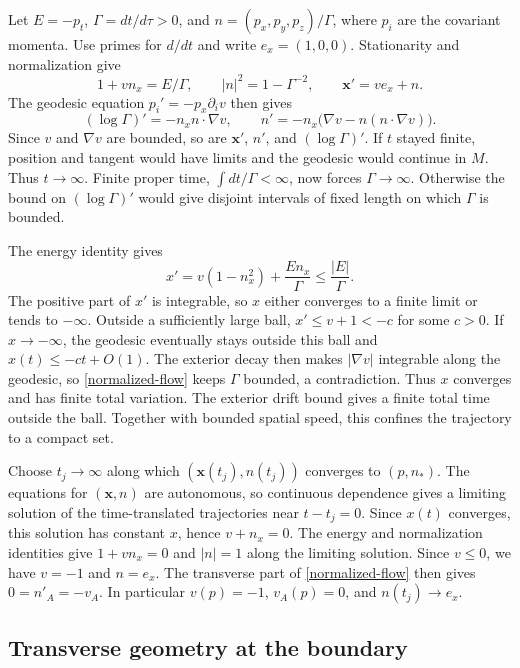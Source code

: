 \documentclass[12pt]{article}
\begin{document}
Let \(E=-p_t\), \(\Gamma=dt/d\tau>0\), and \(n=(p_x,p_y,p_z)/\Gamma\),
where \(p_i\) are the covariant momenta. Use primes for \(d/dt\) and
write \(e_x=(1,0,0)\). Stationarity and normalization give
\[
  1+vn_x=E/\Gamma,\qquad |n|^2=1-\Gamma^{-2},
  \qquad \boldsymbol{x}'=ve_x+n.
\]
The geodesic equation \(p_i'=-p_x\partial_i v\) then gives
\begin{equation}
 (\log\Gamma)'=-n_x n\cdot\nabla v,\qquad
 n'=-n_x\bigl(\nabla v-n(n\cdot\nabla v)\bigr).
 \label{normalized-flow}
\end{equation}
Since \(v\) and \(\nabla v\) are bounded, so are
\(\boldsymbol{x}'\), \(n'\), and \((\log\Gamma)'\).
If \(t\) stayed finite, position and tangent would have limits and the
geodesic would continue in \(M\). Thus \(t\to\infty\).
Finite proper time, \(\int dt/\Gamma<\infty\), now forces
\(\Gamma\to\infty\). Otherwise the bound on \((\log\Gamma)'\) would
give disjoint intervals of fixed length on which \(\Gamma\) is bounded.

The energy identity gives
\[
 x'=v(1-n_x^2)+\frac{E n_x}{\Gamma}\leq\frac{|E|}{\Gamma}.
\]
The positive part of \(x'\) is integrable, so \(x\) either converges
to a finite limit or tends to \(-\infty\). Outside a sufficiently large
ball, \(x'\leq v+1<-c\) for some \(c>0\). If \(x\to-\infty\), the
geodesic eventually stays outside this ball and \(x(t)\leq-ct+O(1)\).
The exterior decay then makes \(|\nabla v|\) integrable along the
geodesic, so \eqref{normalized-flow} keeps \(\Gamma\) bounded, a
contradiction. Thus \(x\) converges and has finite total variation.
The exterior drift bound gives a finite total time outside the ball.
Together with bounded spatial speed, this confines the trajectory
to a compact set.

Choose \(t_j\to\infty\) along which \((\boldsymbol{x}(t_j),n(t_j))\)
converges to \((p,n_*)\). The equations for \((\boldsymbol{x},n)\) are
autonomous, so continuous dependence gives a limiting solution of the
time-translated trajectories near \(t-t_j=0\). Since \(x(t)\) converges,
this solution has constant \(x\), hence \(v+n_x=0\). The energy and
normalization identities give \(1+vn_x=0\) and \(|n|=1\) along the
limiting solution. Since \(v\leq0\), we have \(v=-1\) and \(n=e_x\).
The transverse part of \eqref{normalized-flow} then gives
\(0=n'_A=-v_A\). In particular \(v(p)=-1\), \(v_A(p)=0\), and
\(n(t_j)\to e_x\).

\subsection{Transverse geometry at the boundary}
\end{document}
